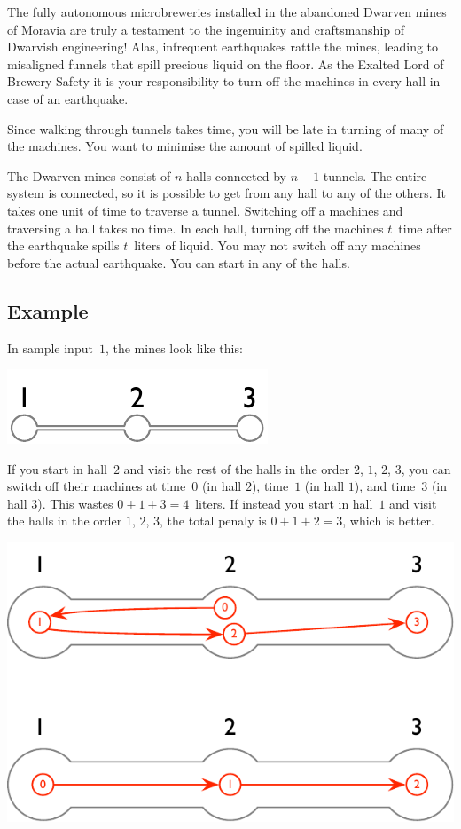
The fully autonomous microbreweries installed in the abandoned Dwarven mines of Moravia are truly a testament to the ingenuinity and craftsmanship of Dwarvish engineering!
Alas, infrequent earthquakes rattle the mines, leading to misaligned funnels that spill precious liquid on the floor.
As the Exalted Lord of Brewery Safety it is your responsibility to turn off the machines in every hall in case of an earthquake.

Since walking through tunnels takes time, 
you will be late in turning of many of the machines.
You want to minimise the amount of spilled liquid.

\medskip
The Dwarven mines consist of $n$ halls connected by $n-1$ tunnels.
The entire system is connected, so it is possible to get from any hall to any of the others.
It takes one unit of time to traverse a tunnel.
Switching off a machines and traversing a hall takes no time.
In each hall, turning off the machines $t$~time after the earthquake spills $t$~liters of liquid.
You may not switch off any machines before the actual earthquake.
You can start in any of the halls.

\subsection*{Example}

In sample input~$1$, the mines look like this:

\includegraphics[width=.15\textwidth]{img/sample-1.pdf}

If you start in hall~$2$ and visit the rest of the halls in the order $2$, $1$, $2$, $3$, you can switch off their machines at time~$0$ (in hall $2$), time~$1$ (in hall $1$), and time~$3$ (in hall $3$).
This wastes $0+1+3=4$~liters.
If instead you start in hall~$1$ and visit the halls in the order $1$, $2$, $3$, the total penaly is $0+1+2=3$, which is better.

\includegraphics[width=.35\textwidth]{img/sample-1-ans.pdf}

